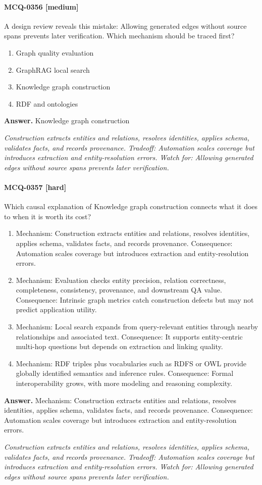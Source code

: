 \paragraph{MCQ-0356 [medium]} A design review reveals this mistake: Allowing generated edges without source spans prevents later verification. Which mechanism should be traced first?
\begin{enumerate}[label=\Alph*.]
\item Graph quality evaluation
\item GraphRAG local search
\item Knowledge graph construction
\item RDF and ontologies
\end{enumerate}
\noindent\textbf{Answer.} Knowledge graph construction
\par\textit{Construction extracts entities and relations, resolves identities, applies schema, validates facts, and records provenance. Tradeoff: Automation scales coverage but introduces extraction and entity-resolution errors. Watch for: Allowing generated edges without source spans prevents later verification.}
\paragraph{MCQ-0357 [hard]} Which causal explanation of Knowledge graph construction connects what it does to when it is worth its cost?
\begin{enumerate}[label=\Alph*.]
\item Mechanism: Construction extracts entities and relations, resolves identities, applies schema, validates facts, and records provenance. Consequence: Automation scales coverage but introduces extraction and entity-resolution errors.
\item Mechanism: Evaluation checks entity precision, relation correctness, completeness, consistency, provenance, and downstream QA value. Consequence: Intrinsic graph metrics catch construction defects but may not predict application utility.
\item Mechanism: Local search expands from query-relevant entities through nearby relationships and associated text. Consequence: It supports entity-centric multi-hop questions but depends on extraction and linking quality.
\item Mechanism: RDF triples plus vocabularies such as RDFS or OWL provide globally identified semantics and inference rules. Consequence: Formal interoperability grows, with more modeling and reasoning complexity.
\end{enumerate}
\noindent\textbf{Answer.} Mechanism: Construction extracts entities and relations, resolves identities, applies schema, validates facts, and records provenance. Consequence: Automation scales coverage but introduces extraction and entity-resolution errors.
\par\textit{Construction extracts entities and relations, resolves identities, applies schema, validates facts, and records provenance. Tradeoff: Automation scales coverage but introduces extraction and entity-resolution errors. Watch for: Allowing generated edges without source spans prevents later verification.}
